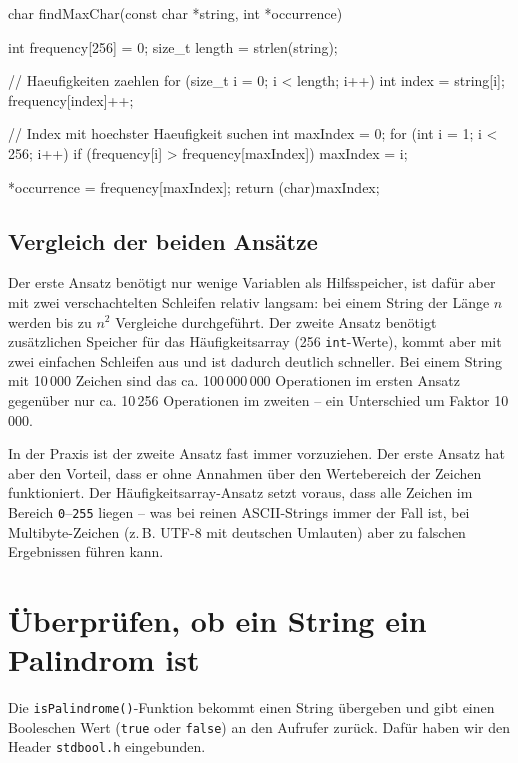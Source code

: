 \begin{codebox}[lang=c, fontsize=\small]
char findMaxChar(const char *string, int *occurrence) {
    int frequency[256] = {0};
    size_t length = strlen(string);

    // Haeufigkeiten zaehlen
    for (size_t i = 0; i < length; i++) {
        int index = string[i];
        frequency[index]++;
    }

    // Index mit hoechster Haeufigkeit suchen
    int maxIndex = 0;
    for (int i = 1; i < 256; i++) {
        if (frequency[i] > frequency[maxIndex]) {
            maxIndex = i;
        }
    }

    *occurrence = frequency[maxIndex];
    return (char)maxIndex;
}
\end{codebox}

\section*{Vergleich der beiden Ansätze}

Der erste Ansatz benötigt nur wenige Variablen als Hilfsspeicher, ist dafür aber
mit zwei verschachtelten Schleifen relativ langsam: bei einem String der Länge
$n$ werden bis zu $n^2$ Vergleiche durchgeführt. Der zweite Ansatz benötigt
zusätzlichen Speicher für das Häufigkeitsarray (256 \texttt{int}-Werte),
kommt aber mit zwei einfachen Schleifen aus und ist dadurch deutlich schneller.
Bei einem String mit 10\,000 Zeichen sind das ca. 100\,000\,000 Operationen im
ersten Ansatz gegenüber nur ca. 10\,256 Operationen im zweiten -- ein
Unterschied um Faktor 10\,000.

In der Praxis ist der zweite Ansatz fast immer vorzuziehen. Der erste Ansatz hat
aber den Vorteil, dass er ohne Annahmen über den Wertebereich der Zeichen
funktioniert. Der Häufigkeitsarray-Ansatz setzt voraus, dass alle Zeichen im
Bereich \texttt{0}--\texttt{255} liegen -- was bei reinen
ASCII-Strings immer der Fall ist, bei Multibyte-Zeichen (z.\,B. UTF-8 mit
deutschen Umlauten) aber zu falschen Ergebnissen führen kann.




\chapter{Überprüfen, ob ein String ein Palindrom ist}

Die \texttt{isPalindrome()}-Funktion bekommt einen String übergeben und
gibt einen Booleschen Wert (\texttt{true} oder \texttt{false}) an
den Aufrufer zurück. Dafür haben wir den Header \texttt{stdbool.h}
eingebunden.

